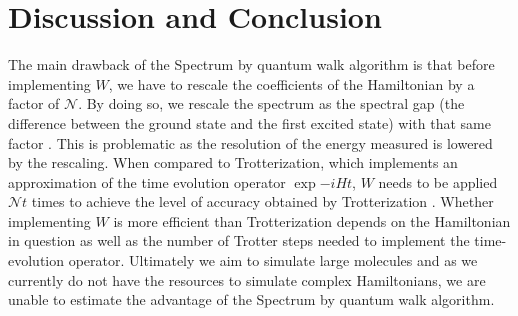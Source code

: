 \newpage

\chapter{Discussion and Conclusion}


The main drawback of the Spectrum by quantum walk algorithm is that before implementing $W$, we have to rescale the coefficients of the Hamiltonian by a factor of $\mathcal{N}$. By doing so, we rescale the spectrum as the spectral gap (the difference between the ground state and the first excited state) with that same factor \cite{steiger, poulin}. This is problematic as the resolution of the energy measured is lowered by the rescaling. When compared to Trotterization, which implements an approximation of the time evolution operator $\exp{-iHt}$, $W$ needs to be applied $\mathcal{N} t$ times to achieve the level of accuracy obtained by Trotterization \cite[p.~87]{steiger}. Whether implementing $W$ is more efficient than Trotterization depends on the Hamiltonian in question as well as the number of Trotter steps needed to implement the time-evolution operator. Ultimately we aim to simulate large molecules and as we currently do not have the resources to simulate complex Hamiltonians, we are unable to estimate the advantage of the Spectrum by quantum walk algorithm.
